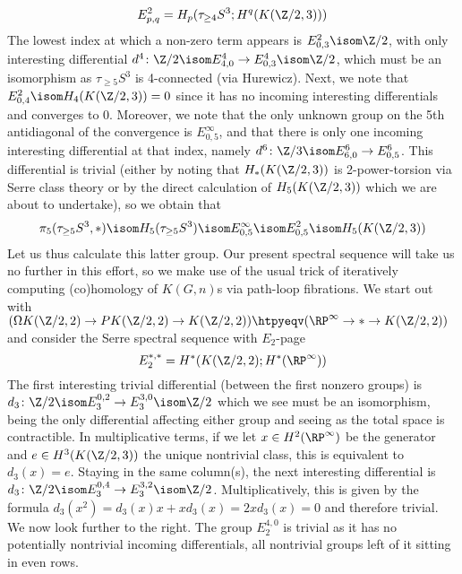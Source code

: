 \begin{solution}
	\begin{equation*}
		E^2_{p, q} = H_p(\tau_{\geq 4} S^3; H^q(K(\Zn{2}, 3)))
	\end{equation*}
	The lowest index at which a non-zero term appears is $E^2_{0, 3} \isom \Zn{2}$, with only interesting differential $d^4\colon \Zn{2} \isom E^4_{4, 0} \to E^4_{0, 3} \isom \Zn{2}$, which must be an isomorphism as $\tau_{\geq 5} S^3$ is 4-connected (via Hurewicz).
	Next, we note that $E^2_{0, 4} \isom H_4(K(\Zn{2}, 3)) = 0$ since it has no incoming interesting differentials and converges to 0.
	Moreover, we note that the only unknown group on the 5th antidiagonal of the convergence is $E^\infty_{0, 5}$, and that there is only one incoming interesting differential at that index, namely $d^6\colon \Zn{3} \isom E^6_{6, 0} \to E^6_{0, 5}$.
	This differential is trivial (either by noting that $H_*(K(\Zn{2}, 3))$ is 2-power-torsion via Serre class theory or by the direct calculation of $H_5(K(\Zn{2}, 3))$ which we are about to undertake), so we obtain that 
	\begin{equation*}
		\pi_5(\tau_{\geq 5} S^3, *) \isom H_5(\tau_{\geq 5} S^3) \isom E^\infty_{0, 5} \isom E^2_{0, 5} \isom H_5(K(\Zn{2}, 3))
	\end{equation*}
	Let us thus calculate this latter group.
	Our present spectral sequence will take us no further in this effort, so we make use of the usual trick of iteratively computing (co)homology of $K(G, n)$s via path-loop fibrations.
	We start out with $(\Omega K(\Zn{2}, 2) \to P K(\Zn{2}, 2) \to K(\Zn{2}, 2)) \htpyeqv (\RP^\infty \to * \to K(\Zn{2}, 2))$ and consider the Serre spectral sequence with $E_2$-page
	\begin{equation*}
		E_2^{*, *} = H^*(K(\Zn{2}, 2); H^*(\RP^\infty))
	\end{equation*}
	The first interesting trivial differential (between the first nonzero groups) is $d_3\colon \Zn{2} \isom E_3^{0, 2} \to E_3^{3, 0} \isom \Zn{2}$ which we see must be an isomorphism, being the only differential affecting either group and seeing as the total space is contractible.
	In multiplicative terms, if we let $x \in H^2(\RP^\infty)$ be the generator and $e \in H^3(K(\Zn{2}, 3))$ the unique nontrivial class, this is equivalent to $d_3(x) = e$.
	Staying in the same column(s), the next interesting differential is $d_3\colon \Zn{2} \isom E_3^{0, 4} \to E_3^{3, 2} \isom \Zn{2}$.
	Multiplicatively, this is given by the formula $d_3(x^2) = d_3(x) x + x d_3(x) = 2 x d_3(x) = 0$ and therefore trivial.
	We now look further to the right.
	The group $E_2^{4, 0}$ is trivial as it has no potentially nontrivial incoming differentials, all nontrivial groups left of it sitting in even rows.

\end{solution}
